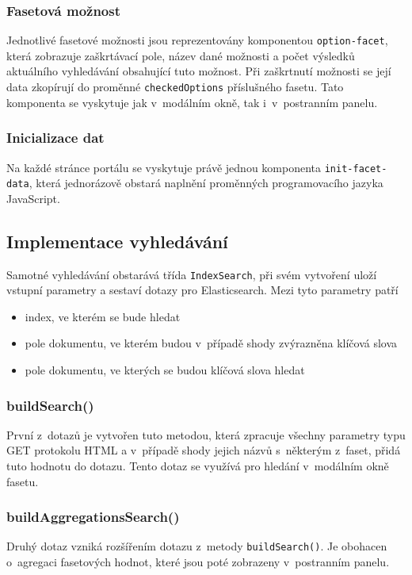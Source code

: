 \subsubsection*{Fasetová možnost}
Jednotlivé fasetové možnosti jsou reprezentovány komponentou \texttt{option-facet}, která zobrazuje zaškrtávací pole, název dané možnosti a počet výsledků aktuálního vyhledávání obsahující tuto možnost. Při zaškrtnutí možnosti se její data zkopírují do proměnné \texttt{checkedOptions} příslušného fasetu. Tato komponenta se vyskytuje jak v~modálním okně, tak i~v~postranním panelu.

\subsubsection*{Inicializace dat}
Na každé stránce portálu se vyskytuje právě jednou komponenta \texttt{init-facet-data}, která jednorázově obstará naplnění proměnných programovacího jazyka JavaScript.

\subsection{Implementace vyhledávání}
Samotné vyhledávání obstarává třída \texttt{IndexSearch}, při svém vytvoření uloží vstupní parametry a sestaví dotazy pro Elasticsearch. Mezi tyto parametry patří
\begin{itemize}
    \item index, ve kterém se bude hledat
    \item pole dokumentu, ve kterém budou v~případě shody zvýrazněna klíčová slova
    \item pole dokumentu, ve kterých se budou klíčová slova hledat
\end{itemize}
\subsubsection*{buildSearch()}
První z~dotazů je vytvořen tuto metodou, která zpracuje všechny parametry typu GET protokolu HTML a v~případě shody jejich názvů s~některým z~faset, přidá tuto hodnotu do dotazu. Tento dotaz se využívá pro hledání v~modálním okně fasetu. 

\subsubsection*{buildAggregationsSearch()}
Druhý dotaz vzniká rozšířením dotazu z~metody \texttt{buildSearch()}. Je obohacen o~agregaci fasetových hodnot, které jsou poté zobrazeny v~postranním panelu.

